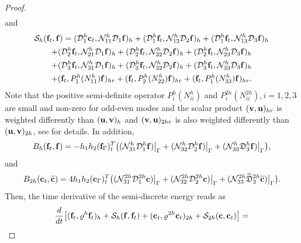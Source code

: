 \begin{proof}
\begin{multline*}
\end{multline*}
and 
\begin{multline*}
\mathcal{S}_{h}({\bf f}_t,{\bf f}) = (\mathcal{D}_1^{h}{\bf c}_t,\mathcal{N}_{11}^{h}\mathcal{D}_1{\bf f})_{h} +  (\mathcal{D}_1^{h}{\bf f}_t,\mathcal{N}_{12}^{h}\mathcal{D}_2{\bf f})_{h} +  (\mathcal{D}_1^{h}{\bf f}_t,\mathcal{N}_{13}^{h}\mathcal{D}_3{\bf f})_{h}\\
+  (\mathcal{D}_2^{h}{\bf f}_t,\mathcal{N}_{21}^{h}\mathcal{D}_1{\bf f})_{h} 
+  (\mathcal{D}_2^{h}{\bf f}_t,\mathcal{N}_{22}^{h}\mathcal{D}_2{\bf f})_{h} +  (\mathcal{D}_2^{h}{\bf f}_t,\mathcal{N}_{23}^{h}\mathcal{D}_3{\bf f})_{h} \\
+  (\mathcal{D}_3^{h}{\bf f}_t,\mathcal{N}_{31}^{h}\mathcal{D}_1{\bf f})_{h} 
+  (\mathcal{D}_3^{h}{\bf f}_t,\mathcal{N}_{32}^{h}\mathcal{D}_2{\bf f})_{h} +  (\mathcal{D}_3^{h}{\bf f}_t,\mathcal{N}_{33}^{h}\mathcal{D}_3{\bf f})_{h}\\
+ ({\bf f}_t, P^{h}_1(N_{11}^h){\bf f})_{hr} + ({\bf f}_t, P^{h}_2(N_{22}^h){\bf f})_{hr} + ({\bf f}_t, P^{h}_1(N_{33}^h){\bf f})_{hr}.
\end{multline*}
Note that the positive semi-definite operator $P_i^{h}(N_{ii}^{h})$ and $P_i^{2h}(N_{ii}^{2h}), i = 1,2,3$ are small and non-zero for odd-even modes and the scalar product $({\bf v}, {\bf u})_{hr}$ is weighted differently than $({\bf u}, {\bf v})_h$ and $({\bf v}, {\bf u})_{2hr}$ is also weighted differently than $({\bf u}, {\bf v})_{2h}$, see \cite{sjogreen2012fourth, petersson2015wave} for details. In addition,
\begin{equation}\label{boundary_f}
B_h ({\bf f}_t,{\bf f}) = -h_1h_2({\bf f}_{\Gamma})_t^T\big((\mathcal{N}_{31}^h{\mathcal D}_1^h {\bf f})\big|_{\Gamma}+ (\mathcal{N}_{32}^h\mathcal{D}_2^h{\bf f})\big|_{\Gamma}+(\mathcal{N}_{33}^h\mathfrak{D}_3^h{\bf f})\big|_{\Gamma}\big),
\end{equation}
and
\begin{equation}\label{bounary_c}
B_{2h} ({\bf c}_t,\wt{\bf c}) = 4h_1h_2({\bf c}_{\Gamma})_t^T\big((\mathcal{N}_{31}^{2h}\mathcal{D}_1^{2h}{\bf c})\big|_{\Gamma}+ (\mathcal{N}_{32}^{2h}\mathcal{D}_2^{2h}{\bf c})\big|_{\Gamma}+(\mathcal{N}_{33}^{2h}\wt{\mathfrak{D}}_3^{2h}\wt{{\bf c}})\big|_{\Gamma}\big).
\end{equation}
Then, the time derivative of the semi-discrete energy reads as
\begin{multline}\label{semi_energy_1}
\frac{d}{dt}\big[({\bf f}_t,\varrho^h {\bf f}_t)_h + \mathcal{S}_{h}({\bf f},{\bf f}_t) + ({\bf c}_t,\varrho^{2h} {\bf c}_t)_{2h} + \mathcal{S}_{2h}({\bf c},{\bf c}_t) \big]  = \\

\end{multline}
\end{proof}

